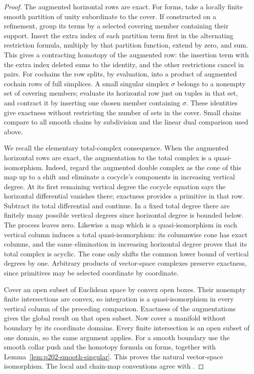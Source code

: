\documentclass[11pt,oneside,openany]{book}
\theoremstyle{plain}
\theoremstyle{definition}
\theoremstyle{remark}
\begin{document}
\begin{proof}
The augmented horizontal rows are exact. For forms,
take a locally finite smooth partition of unity subordinate
to the cover. If constructed on a refinement, group its
terms by a selected covering member containing their
support. Insert the extra index of each partition term
first in the alternating restriction formula, multiply by
that partition function, extend by zero, and sum.
This gives a contracting homotopy of the augmented row:
the insertion term with the extra index deleted sums
to the identity, and the other restrictions cancel
in pairs. For cochains the row splits, by evaluation,
into a product of augmented cochain rows of full simplices.
A small singular simplex \(\sigma\) belongs to a
nonempty set of covering members; evaluate its horizontal
row just on tuples in that set, and contract it by
inserting one chosen member containing \(\sigma\).
These identities give exactness without restricting the
number of sets in the cover. Small chains compare to
all smooth chains by subdivision and the linear dual
comparison used above.

We recall the elementary total-complex consequence.
When the augmented horizontal rows are exact, the
augmentation to the total complex is a quasi-isomorphism.
Indeed, regard the augmented double complex as the cone
of this map up to a shift and eliminate a cocycle's
components in increasing vertical degree. At its first
remaining vertical degree the cocycle equation says the
horizontal differential vanishes there; exactness provides
a primitive in that row. Subtract its total differential
and continue. In a fixed total degree there are finitely
many possible vertical degrees since horizontal degree is
bounded below. The process leaves zero. Likewise a map
which is a quasi-isomorphism in each vertical column
induces a total quasi-isomorphism: its columnwise cone
has exact columns, and the same elimination in increasing
horizontal degree proves that its total complex is acyclic.
The cone only shifts the common lower bound of vertical
degrees by one. Arbitrary products of vector-space complexes
preserve exactness, since primitives may be selected
coordinate by coordinate.

Cover an open subset of Euclidean space by convex open
boxes. Their nonempty finite intersections are convex, so
integration is a quasi-isomorphism in every vertical
column of the preceding comparison. Exactness of the
augmentations gives the global result on that open subset.
Now cover a manifold without boundary by its coordinate
domains. Every finite intersection is an open subset of
one domain, so the same argument applies. For a smooth
boundary use the smooth collar push and the homotopy
formula on forms, together with
Lemma~\ref{lem:p202-smooth-singular}. This proves the
natural vector-space isomorphism. The local and chain-map
conventions agree with \cite[Chapter 18]{LeeSM}.


\end{proof}
\end{document}
